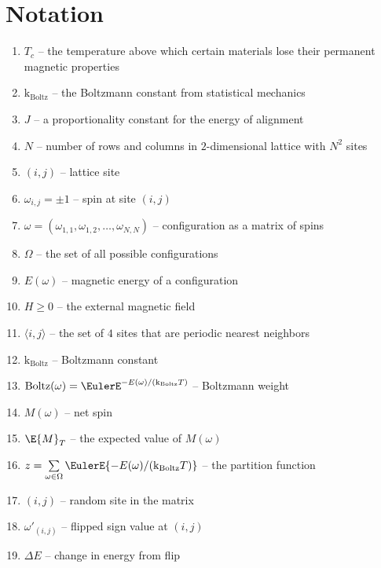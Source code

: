 \documentclass[12pt]{article}
\begin{document}
\section*{Notation}
\begin{enumerate}
    \item
        \( T_c \) -- the temperature above which certain materials lose
        their permanent magnetic properties
    \item
        \( \text{k}_{\text{Boltz}} \) -- the Boltzmann constant from
        statistical mechanics
    \item
        \( J \) -- a proportionality constant for the energy of
        alignment
    \item
        \( N \) -- number of rows and columns in \( 2 \)-dimensional
        lattice with \( N^2 \) sites
    \item
        \( (i,j) \) -- lattice site
    \item
        \( \omega_{i,j} = \pm 1 \) -- spin at site \( (i,j) \)
    \item
        \( \omega = (\omega_{1,1}, \omega_{1,2}, \dots, \omega_{N,N}) \)
        -- configuration as a matrix of spins
    \item
        \( \Omega \) -- the set of all possible configurations
    \item
        \( E(\omega) \) -- magnetic energy of a configuration
    \item
        \( H \ge 0 \) -- the external magnetic field
    \item
        \( \langle i, j \rangle \) -- the set of \( 4 \) sites that are
        periodic nearest neighbors
    \item
        \( \text{k}_{\text{Boltz}} \) -- Boltzmann constant
    \item
        \(
        \operatorname{Boltz}
        (\omega) = \EulerE^{-E(\omega)/(\text{k}_{\text{Boltz}} T)} \)
        -- Boltzmann weight
    \item
        \( M(\omega) \) -- net spin
    \item
        \( \E{M}_T \) -- the expected value of \( M(\omega) \)
    \item
        \( z = \sum\limits_{\omega \in \Omega} \EulerE{-E(\omega)/(\text
        {k}_{\text{Boltz}} T)} \) -- the partition function
    \item
        \( (i,j) \) -- random site in the matrix
    \item
        \( \omega'_{(i,j)} \) -- flipped sign value at \( (i,j) \)
    \item
        \( \Delta E \) -- change in energy from flip

\end{enumerate}
\end{document}
